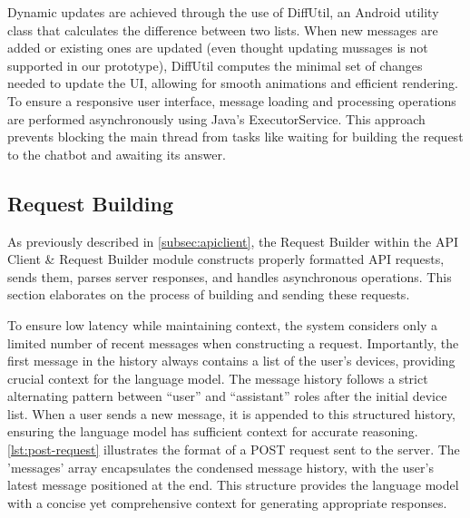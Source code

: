 Dynamic updates are achieved through the use of DiffUtil, an Android utility class that calculates the difference between two lists. When new messages are added or existing ones are updated (even thought updating mussages is not supported in our prototype), DiffUtil computes the minimal set of changes needed to update the UI, allowing for smooth animations and efficient rendering.
To ensure a responsive user interface, message loading and processing operations are performed asynchronously using Java's ExecutorService. This approach prevents blocking the main thread from tasks like waiting for building the request to the chatbot and awaiting its answer.


\subsection{Request Building}
\label{sec:req-building}
As previously described in \cref{subsec:apiclient}, the Request Builder within the API Client \& Request Builder module constructs properly formatted API requests, sends them, parses server responses, and handles asynchronous operations.
This section elaborates on the process of building and sending these requests.

To ensure low latency while maintaining context, the system considers only a limited number of recent messages when constructing a request. Importantly, the first message in the history always contains a list of the user's devices, providing crucial context for the language model.
The message history follows a strict alternating pattern between ``user'' and ``assistant'' roles after the initial device list. When a user sends a new message, it is appended to this structured history, ensuring the language model has sufficient context for accurate reasoning.
\cref{lst:post-request} illustrates the format of a POST request sent to the server. The 'messages' array encapsulates the condensed message history, with the user's latest message positioned at the end. This structure provides the language model with a concise yet comprehensive context for generating appropriate responses.


